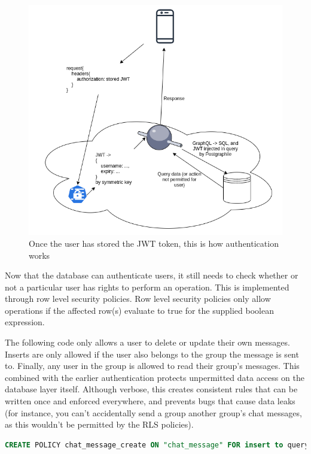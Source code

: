 \documentclass{l4proj}
\begin{document}
\begin{figure}[H]
    \centering
    \includegraphics[width=1.0\linewidth]{authentication.png}    
    \caption{
  Once the user has stored the JWT token, this is how authentication works
    }
\end{figure}

Now that the database can authenticate users, it still needs to check whether or not a particular user has rights to perform an operation. This is implemented through row level security policies. Row level security policies only allow operations if the affected row(s) evaluate to true for the supplied boolean expression.

The following code only allows a user to delete or update their own messages. Inserts are only allowed if the user also belongs to the group the message is sent to. Finally, any user in the group is allowed to read their group's messages. This combined with the earlier authentication protects unpermitted data access on the database layer itself. Although verbose, this creates consistent rules that can be written once and enforced everywhere, and prevents bugs that cause data leaks (for instance, you can't accidentally send a group another group's chat messages, as this wouldn't be permitted by the RLS policies).

\begin{lstlisting}[language=SQL, caption={Row level security policy only allowing a user send messages as themselves to their team}, ]
CREATE POLICY chat_message_create ON "chat_message" FOR insert to query_sender with check (username = (select username from active_user()) and groupName = (select groupName from active_user()));
\end{lstlisting}
\end{document}
